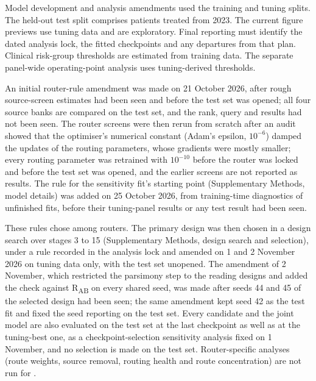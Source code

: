 Model development and analysis amendments used the training and tuning splits.
The held-out test split comprises patients treated from 2023. The current
figure previews use tuning data and are exploratory. Final reporting must
identify the dated analysis lock, the fitted checkpoints and any departures
from that plan.  Clinical risk-group thresholds are estimated from training data.
The separate panel-wide operating-point analysis uses tuning-derived thresholds.

An initial router-rule amendment was made on 21 October 2026, after rough source-screen
estimates had been seen and before the test set was opened; all four source
banks are compared on the test set, and the rank, query and \opera{} results had
not been seen.
The router screens were then rerun from scratch after an audit showed that the
optimiser's numerical constant (Adam's epsilon, $10^{-6}$) damped the updates of
the routing parameters, whose gradients were mostly smaller; every routing
parameter was retrained with $10^{-10}$ before the router was locked and before
the test set was opened, and the earlier screens are not reported as results.
The rule for the sensitivity fit's starting point (Supplementary Methods, model details) was added on
25 October 2026, from training-time diagnostics of unfinished fits, before
their tuning-panel results or any test result had been seen.

These rules chose among routers. The primary \opera{} design was then chosen in
a design search over stages 3 to 15 (Supplementary Methods, design search and
selection), under a rule recorded in the analysis lock and amended on 1 and
2 November 2026 on tuning data only, with the test set unopened. The
amendment of 2 November, which restricted the parsimony step to the reading
designs and added the check against R\textsubscript{AB} on every shared seed,
was made after seeds 44 and 45 of the selected design had been seen; the same
amendment kept seed 42 as the test fit and fixed the seed reporting on the test
set. Every candidate and the joint model are also evaluated on the test set at
the last checkpoint as well as at the tuning-best one, as a checkpoint-selection
sensitivity analysis fixed on 1 November, and no selection is made on the test
set. Router-specific analyses (route weights, source removal, routing health
and route concentration) are not run for \opera{}. 

